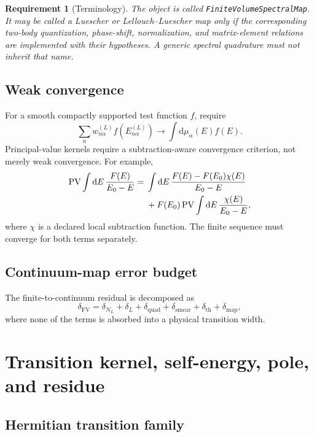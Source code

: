 \documentclass[11pt]{article}
\newtheorem{requirement}[definition]{Requirement}
\newcommand{\dd}{\mathrm{d}}
\newcommand{\PV}{\operatorname{PV}}
\newcommand{\FiniteVolumeMap}{\texttt{FiniteVolume\allowbreak Spectral\allowbreak Map}}
\begin{document}
\begin{requirement}[Terminology]
The object is called \FiniteVolumeMap.  It may be called a Luescher or
Lellouch--Luescher map only if the corresponding two-body quantization,
phase-shift, normalization, and matrix-element relations are implemented with
their hypotheses.  A generic spectral quadrature must not inherit that name.
\end{requirement}

\subsection{Weak convergence}

For a smooth compactly supported test function \(f\), require
\begin{equation}
 \sum_n w_{n\alpha}^{(L)}f(E_{n\alpha}^{(L)})
 \longrightarrow
 \int \dd\mu_\alpha(E)f(E).
 \label{eq:weak-convergence}
\end{equation}
Principal-value kernels require a subtraction-aware convergence criterion,
not merely weak convergence.  For example,
\begin{align}
 \PV\int\dd E\,
 \frac{F(E)}{E_0-E}
 ={}&
 \int\dd E\,
 \frac{F(E)-F(E_0)\chi(E)}{E_0-E}
 \notag\\
 &+F(E_0)
 \PV\int\dd E\,
 \frac{\chi(E)}{E_0-E},
 \label{eq:pv-subtraction}
\end{align}
where \(\chi\) is a declared local subtraction function.  The finite sequence
must converge for both terms separately.

\subsection{Continuum-map error budget}

The finite-to-continuum residual is decomposed as
\begin{equation}
 \delta_{\mathrm{FV}}
 =
 \delta_{N_L}
 +\delta_L
 +\delta_{\mathrm{quad}}
 +\delta_{\mathrm{smear}}
 +\delta_{\mathrm{th}}
 +\delta_{\mathrm{map}},
 \label{eq:fv-error}
\end{equation}
where none of the terms is absorbed into a physical transition width.

\section{Transition kernel, self-energy, pole, and residue}
\label{sec:self-energy}

\subsection{Hermitian transition family}
\end{document}
